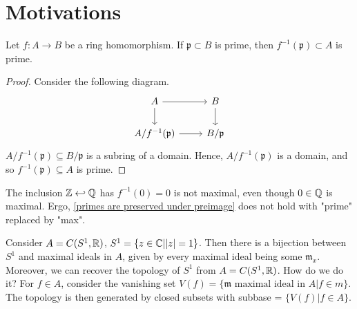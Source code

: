 \section{Motivations}

\begin{lemma}
  \label{primes are preserved under preimage}
  Let $f:A \to B$ be a ring homomorphism. If $\mathfrak p \subset B$ is prime, then $f^{-1}(\mathfrak p) \subset A$ is prime.
\end{lemma}

\begin{proof}
  Consider the following diagram.
  \begin{equation*}
  \begin{tikzcd}
    A \arrow[r] \arrow[d]
    & B \arrow[d] \\
    A /{ f^{-1}(\mathfrak p) } \arrow[r]
    & B /{\mathfrak p}
  \end{tikzcd}
  \end{equation*}
  $A /{f^{-1}(\mathfrak p)} \subseteq B /{\mathfrak p}$
  is a subring of a domain. Hence,
$A / {f^{-1}(\mathfrak p)}$
is a domain, and so
$f^{-1}(\mathfrak p) \subseteq A$
is prime.
\end{proof}

\begin{example}
The inclusion $\mathbb Z \hookleftarrow \mathbb Q$ has $f^{-1}(0) = 0$ is not maximal, even though $0 \in \mathbb Q$ is maximal.
Ergo, \cref{primes are preserved under preimage} does not hold with "prime" replaced by "max".
\end{example}

\begin{example}
Consider $A = C(S^1, \mathbb R)$, $S^1 = \{ z \in \mathbb C | |z|=1 \}$. Then there is a bijection between $S^1$ and maximal ideals in $A$, given by every maximal ideal being some $\mathfrak m_x$. Moreover, we can recover the topology of $S^1$ from $A = C(S^1, \mathbb R)$.
How do we do it?
For $f \in A$, consider the vanishing set $V(f) = \{ \mathfrak m \text{ maximal ideal in } A | f \in m \}$.
The topology is then generated by closed subsets with subbase = $\{V(f) | f \in A\}$.
\end{example}

